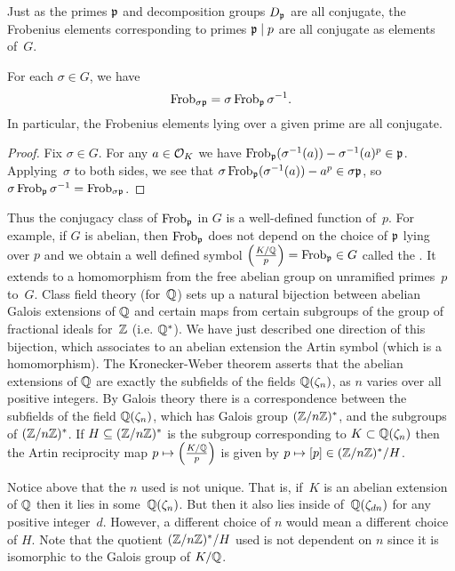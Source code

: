 Just as the primes $\mathfrak{p}$ and decomposition groups $D_{\mathfrak{p}}$ are all
conjugate, the Frobenius elements corresponding to primes
$\mathfrak{p}\mid p$ are all conjugate as elements of~$G$.

\begin{proposition}
For each $\sigma \in G$, we have
$$
 \operatorname{Frob}_{\sigma\mathfrak{p}} = \sigma\operatorname{Frob}_{\mathfrak{p}}\sigma^{-1}.
$$
In particular, the Frobenius elements lying over a given
prime are all conjugate.
\end{proposition}
\begin{proof}
Fix $\sigma\in G$. For any $a\in\mathcal{O}_K$ we have
$\operatorname{Frob}_{\mathfrak{p}}(\sigma^{-1}(a)) - \sigma^{-1}(a)^p \in \mathfrak{p}$.
Applying~$\sigma$ to both sides, we see that
$\sigma\operatorname{Frob}_{\mathfrak{p}}(\sigma^{-1}(a)) - a^p \in \sigma\mathfrak{p}$,
so $\sigma\operatorname{Frob}_{\mathfrak{p}}\sigma^{-1} = \operatorname{Frob}_{\sigma \mathfrak{p}}$.
\end{proof}

Thus the conjugacy class of $\operatorname{Frob}_{\mathfrak{p}}$ in $G$ is a well-defined
function of~$p$.  For example, if $G$ is abelian, then $\operatorname{Frob}_{\mathfrak{p}}$ does
not depend on the choice of $\mathfrak{p}$ lying over $p$ and we obtain a well
defined symbol $\left(\frac{K/\mathbb{Q}}{p}\right) =\operatorname{Frob}_{\mathfrak{p}}\in G$ called the .  It extends to a homomorphism from the free abelian
group on unramified primes~$p$ to~$G$.
Class field theory (for~$\mathbb{Q}$) sets up a natural bijection
between abelian Galois extensions of $\mathbb{Q}$ and certain maps from
certain subgroups of the group of fractional ideals for~$\mathbb{Z}$ (i.e. $\mathbb{Q}^*$).
  We have
just described one direction of this bijection, which associates to an
abelian extension the Artin symbol (which is a homomorphism).
The Kronecker-Weber theorem asserts that the abelian extensions of
$\mathbb{Q}$ are exactly the subfields of the fields $\mathbb{Q}(\zeta_n)$, as $n$
varies over all positive integers.  By Galois theory there is a
correspondence between the subfields of the field $\mathbb{Q}(\zeta_n)$,
which has Galois group $(\mathbb{Z}/n\mathbb{Z})^*$, and the subgroups of $(\mathbb{Z}/n\mathbb{Z})^*$.
If $H \subseteq (\mathbb{Z}/n\mathbb{Z})^*$ is the subgroup corresponding to
$K \subset \mathbb{Q}(\zeta_n)$ then the Artin reciprocity map
$p\mapsto \left(\frac{K/\mathbb{Q}}{p}\right)$ is given by $p\mapsto [p]\in (\mathbb{Z}/n\mathbb{Z})^*/H$.

\begin{remark}
	Notice above that the $n$ used is not unique. That is,
	if~$K$ is an abelian extension of $\mathbb{Q}$ then it lies in some~$\mathbb{Q}(\zeta_n)$.
	But then it also lies inside of~$\mathbb{Q}(\zeta_{dn})$ for any
	positive integer~$d$. However, a different choice of $n$
	would mean a different choice of $H$. Note that the
	quotient $(\mathbb{Z}/n\mathbb{Z})^*/H$ used is not dependent on $n$
	since it is isomorphic to the Galois group of $K/\mathbb{Q}$.
\end{remark}

